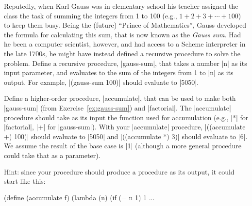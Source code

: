 \begin{schemeregion}
\beforesplitex
\begin{exercise}\greenstar\label{ex:gauss-sum}
Reputedly, when Karl Gauss was in elementary school his teacher assigned the class the task of summing the integers from 1 to 100 (e.g., $1 + 2 + 3 + \cdots + 100$) to keep them busy.  Being the (future) ``Prince of Mathematics'', Gauss developed the formula for calculating this sum, that is now known as the \emph{Gauss sum}.   
Had he been a computer scientist, however, and had access to a Scheme interpreter in the late 1700s, he might have instead defined a recursive procedure to solve the problem. Define a recursive procedure, \scheme|gauss-sum|, that takes a number \scheme|n| as its input parameter, and evaluates to the sum of the integers from 1 to \scheme|n| as its output.  For example, \scheme|(gauss-sum 100)| should evaluate to \schemeresult|5050|.
\end{exercise}
\aftersplitex
{} %

\beforesplitex
\begin{exercise}\goldstar{}
Define a higher-order procedure, \scheme|accumulate|, that can be used to make both \scheme|gauss-sum| (from Exercise~\ref{ex:gauss-sum}) and \scheme|factorial|.  The \scheme|accumulate| procedure should take as its input the function used for accumulation (e.g., \scheme|*| for \scheme|factorial|, \scheme|+| for \scheme|gauss-sum|).  With your \scheme|accumulate| procedure, \scheme|((accumulate +) 100)| should evaluate to \schemeresult|5050| and \scheme|((accumulate *) 3)| should evaluate to \schemeresult|6|.  We assume the result of the base case is \scheme|1| (although a more general procedure could take that as a parameter).

Hint: since your procedure should produce a procedure as its output, it could start like this:
\begin{schemedisplay}
(define (accumulate f)
  (lambda (n) 
     (if (= n 1) 1
         ... 
\end{schemedisplay}
\end{exercise}
\aftersplitex



\end{schemeregion}
